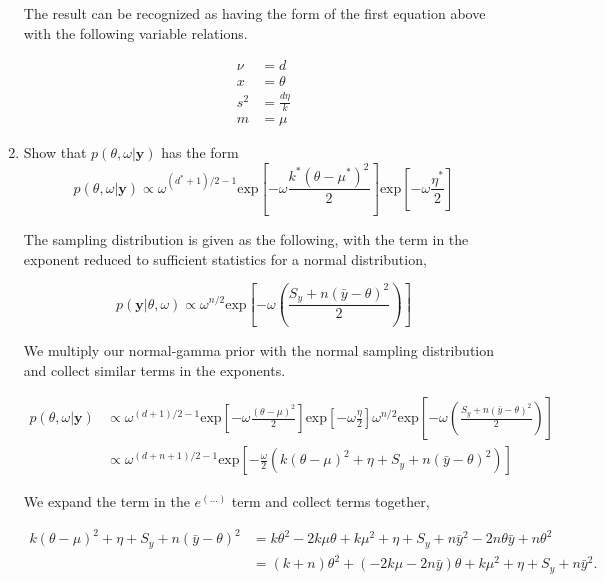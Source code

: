 \documentclass[10pt]{article}
\newcommand{\by}{\mathbf{y}}
\begin{document}
\begin{enumerate}[label=(\Alph*)]
        The result can be recognized as having the form of the first equation above with the following variable relations.

        \begin{align*}
          \nu &= d \\
          x &= \theta \\
          s^2 & = \frac{d \eta}{k}\\
          m & = \mu
        \end{align*}


      \item Show that $p(\theta, \omega | \by)$ has the form
        $$p(\theta, \omega| \by) \propto \omega^{(d^* + 1)/2 -1} \text{exp} \left [ -\omega \frac{k^* ( \theta - \mu^*)^2}{2}\right] \text{exp} \left [ -\omega \frac{\eta^*}{2}\right] $$

        The sampling distribution is given as the following, with the term in the exponent reduced to sufficient statistics for a normal distribution,

        $$p(\by| \theta, \omega) \propto \omega^{n/2} \text{exp} \left [ -\omega \left ( \frac{S_y + n (\bar{y} - \theta)^2}{2}\right) \right ]$$

        We multiply our normal-gamma prior with the normal sampling distribution and collect similar terms in the exponents.

        \begin{align*}
          p(\theta, \omega | \by) &\propto \omega^{(d+1)/2-1} \text{exp}\left [ -\omega \frac{(\theta - \mu)^2}{2}\right] \text{exp}\left [ -\omega \frac{\eta}{2}\right] \omega^{n/2} \text{exp}\left[ -\omega \left( \frac{S_y + n (\bar{y} - \theta)^2}{2}\right)\right] \\
          &\propto \omega^{(d+n+1)/2 - 1}\text{exp}\left[ -\frac{\omega}{2} \left( k(\theta - \mu)^2 + \eta + S_y + n(\bar{y} - \theta)^2\right)\right]
        \end{align*}

        We expand the term in the $e^{(...)}$ term and collect terms together,

        \begin{align*}
          k(\theta - \mu)^2 + \eta + S_y + n(\bar{y} - \theta)^2 &= k \theta^2 - 2 k \mu \theta + k \mu^2 + \eta + S_y + n\bar{y}^2 - 2n \theta \bar{y} + n \theta^2 \\
          &= (k+n) \theta^2 + (-2k\mu - 2n\bar{y}) \theta + k \mu^2 + \eta + S_y + n \bar{y}^2.
        \end{align*}


\end{enumerate}
\end{document}
